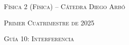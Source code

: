 \documentclass[11pt,spanish]{article}
\begin{document}
    \begin{center}
    \textsc{\large Física 2 (Física) -- Cátedra Diego Arbó}
    \par\end{center}{\large \par}
    
    \begin{center}
    \textsc{\large Primer Cuatrimestre de 2025}
    \par\end{center}{\large \par}
    
    \begin{center}
    \textsc{\large Guía 10: Interferencia}
    \par\end{center}{\large \par}
\end{document}
